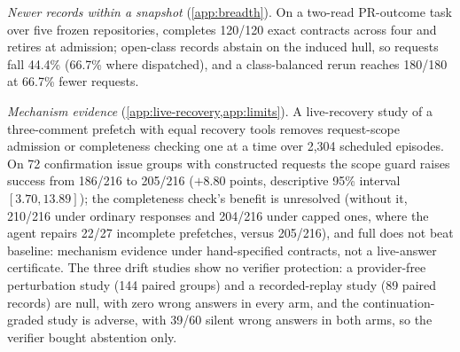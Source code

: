 \emph{Newer records within a snapshot} (\cref{app:breadth}). On a two-read
PR-outcome task over five frozen repositories, \method completes 120/120 exact
contracts across four and retires  at admission; open-class
records abstain on the induced  hull, so requests fall 44.4\%
(66.7\% where dispatched), and a class-balanced rerun reaches 180/180 at 66.7\%
fewer requests.

\emph{Mechanism evidence} (\cref{app:live-recovery,app:limits}). A live-recovery
study of a three-comment prefetch with equal recovery tools removes request-scope
admission or completeness checking one at a time over 2{,}304 scheduled
episodes. On 72 confirmation issue groups with constructed requests the scope
guard raises success from 186/216 to 205/216 ($+8.80$ points, descriptive 95\%
interval $[3.70,13.89]$); the completeness check's benefit is unresolved
(without it, 210/216 under ordinary responses and 204/216 under capped ones,
where the agent repairs 22/27 incomplete prefetches, versus 205/216), and
full does not beat baseline: mechanism evidence under hand-specified contracts,
not a live-answer certificate. The three drift studies show no verifier protection: a
provider-free perturbation study (144 paired groups) and a recorded-replay
study (89 paired records) are null, with zero wrong answers in every arm, and
the continuation-graded study is adverse, with 39/60 silent wrong answers in
both arms, so the verifier bought abstention
only.
